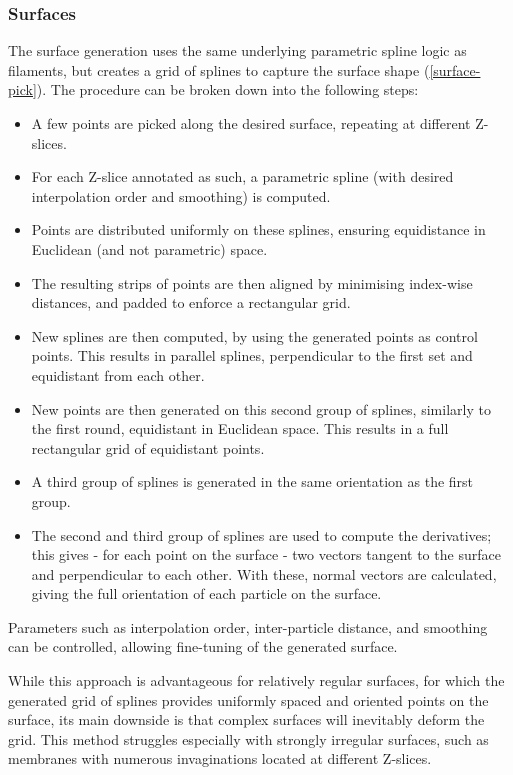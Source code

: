 \subsubsection{Surfaces}
The surface generation uses the same underlying parametric spline logic as filaments, but creates a grid of splines to capture the surface shape (\autoref{surface-pick}). The procedure can be broken down into the following steps:

\begin{itemize}[noitemsep] 
    \item A few points are picked along the desired surface, repeating at different Z-slices.
    \item For each Z-slice annotated as such, a parametric spline (with desired interpolation order and smoothing) is computed.
    \item Points are distributed uniformly on these splines, ensuring equidistance in Euclidean (and not parametric) space.
    \item The resulting strips of points are then aligned by minimising index-wise distances, and padded to enforce a rectangular grid.
    \item New splines are then computed, by using the generated points as control points. This results in parallel splines, perpendicular to the first set and equidistant from each other.
    \item New points are then generated on this second group of splines, similarly to the first round, equidistant in Euclidean space. This results in a full rectangular grid of equidistant points.
    \item A third group of splines is generated in the same orientation as the first group.
    \item The second and third group of splines are used to compute the derivatives; this gives - for each point on the surface - two vectors tangent to the surface and perpendicular to each other. With these, normal vectors are calculated, giving the full orientation of each particle on the surface.
\end{itemize}

Parameters such as interpolation order, inter-particle distance, and smoothing can be controlled, allowing fine-tuning of the generated surface.

While this approach is advantageous for relatively regular surfaces, for which the generated grid of splines provides uniformly spaced and oriented points on the surface, its main downside is that complex surfaces will inevitably deform the grid. This method struggles especially with strongly irregular surfaces, such as membranes with numerous invaginations located at different Z-slices.


